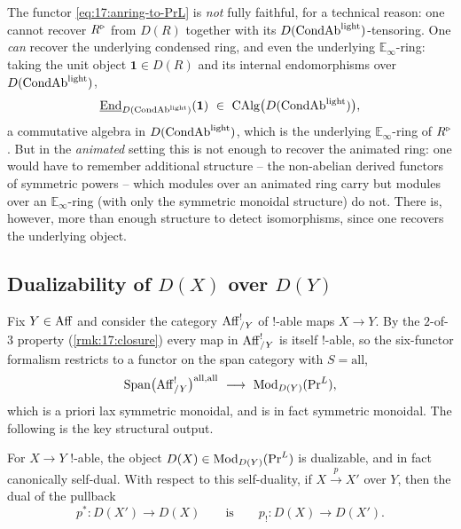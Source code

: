 \begin{remark}
\label{rmk:17:not-ff}
The functor \eqref{eq:17:anring-to-PrL} is \emph{not} fully faithful, for a technical
reason: one cannot recover $R^{\triangleright}$ from $D(R)$ together with its $D(\mathrm{CondAb}^{\mathrm{light}})$-tensoring.
One \emph{can} recover the underlying condensed ring, and even the underlying
$\mathbb{E}_\infty$-ring: taking the unit object $\mathbf 1\in D(R)$ and its internal
endomorphisms over $D(\mathrm{CondAb}^{\mathrm{light}})$,
\begin{equation*}
\underline{\Endop}_{D(\CondAbl)}(\mathbf 1)\ \in\ \CAlg\bigl(D(\CondAbl)\bigr),
\end{equation*}
a commutative algebra in $D(\mathrm{CondAb}^{\mathrm{light}})$, which is the underlying $\mathbb{E}_\infty$-ring of
$R^{\triangleright}$. But in the
\emph{animated} setting this is not enough to recover the animated ring: one would have to
remember additional structure -- the non-abelian derived functors of symmetric powers -- which
modules over an animated ring carry but modules over an $\mathbb{E}_\infty$-ring (with only the
symmetric monoidal structure) do not. There is, however, more than enough structure to
detect isomorphisms, since one recovers the underlying object.
\end{remark}

\subsection{Dualizability of \texorpdfstring{$D(X)$}{D(X)} over \texorpdfstring{$D(Y)$}{D(Y)}}
\label{subsec:17:dualizability}

Fix $Y\in\operatorname{Aff}$ and consider the category $\operatorname{Aff}^{!}_{/Y}$ of $!$-able maps $X\to Y$. By the
$2$-of-$3$ property (\cref{rmk:17:closure}) every map in $\operatorname{Aff}^{!}_{/Y}$ is itself $!$-able,
so the six-functor formalism restricts to a functor on the span category with $S=\mathrm{all}$,
\begin{equation}
\label{eq:17:6ff-over-Y}
\Span\bigl(\Aff^{!}_{/Y}\bigr)^{\mathrm{all},\mathrm{all}}\ \longrightarrow\ \Mod_{D(Y)}(\PrL),
\end{equation}
which is a priori lax symmetric monoidal, and is in fact symmetric monoidal. The
following is the key structural output.

\begin{corollary}
\label{cor:17:self-dual}
For $X\to Y$ $!$-able, the object $D(X)\in\operatorname{Mod}_{D(Y)}(\mathrm{Pr}^{L})$ is dualizable, and in fact
canonically self-dual. With respect to this self-duality, if $X\xrightarrow{p}X'$ over $Y$,
then the dual of the pullback
\begin{equation*}
p^{*}\colon D(X')\to D(X)\qquad\text{is}\qquad p_{!}\colon D(X)\to D(X').
\end{equation*}
\end{corollary}

